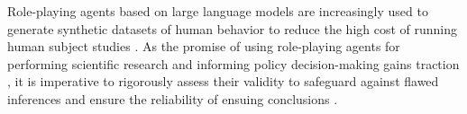 \documentclass{article} %
\begin{document}
Role-playing agents based on large language models are increasingly used to generate synthetic datasets of human behavior to reduce the high cost of running human subject studies \citep{park_generative_2023, hou2025can, huang2024social, balog2025user}. As the promise of using role-playing agents for performing scientific research and informing policy decision-making gains traction \citep{sarstedt2024using}, it is imperative to rigorously assess their validity to safeguard against flawed inferences and ensure the reliability of ensuing conclusions \citep{rossi2024problems, agnew2024illusion}.



      
\end{document}
